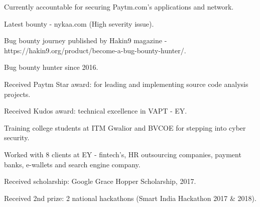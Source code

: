 

\cvsubsection{}

  \begin{cvitems} %
    \item {Currently accountable for securing Paytm.com's applications and network.}
    \item {Latest bounty - nykaa.com (High severity issue).}
    \item {Bug bounty journey published by Hakin9 magazine - https://hakin9.org/product/become-a-bug-bounty-hunter/.}
    \item {Bug bounty hunter since 2016.}
    \item {Received Paytm Star award: for leading and implementing source code analysis projects.}
    \item {Received Kudos award: technical excellence in VAPT - EY.}
    \item {Training college students at ITM Gwalior and BVCOE for stepping into cyber security.}
    \item {Worked with 8 clients at EY - fintech’s, HR outsourcing companies, payment banks, e-wallets and search engine company.}
    \item {Received scholarship: Google Grace Hopper Scholarship, 2017.}
    \item {Received 2nd prize: 2 national hackathons (Smart India Hackathon 2017 \& 2018).}

  \end{cvitems}
